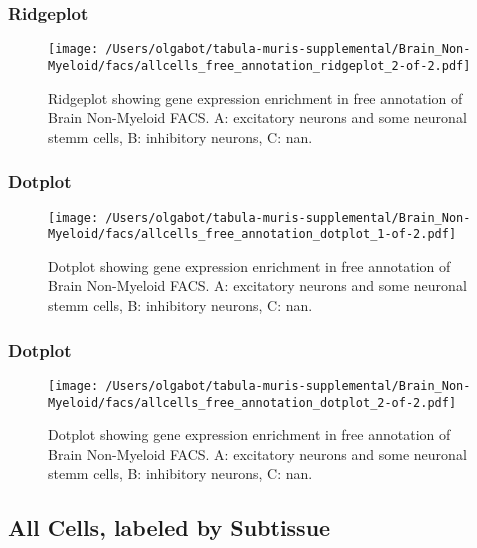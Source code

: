 \clearpage
\clearpage
\subsubsection{Ridgeplot}
\begin{figure}[h]
\centering
\texttt{[image: /Users/olgabot/tabula-muris-supplemental/Brain\_Non-Myeloid/facs/allcells\_free\_annotation\_ridgeplot\_2-of-2.pdf]}

\caption{ Ridgeplot  showing gene expression enrichment in free annotation of Brain Non-Myeloid FACS. A: excitatory neurons and some neuronal stemm cells, B: inhibitory neurons, C: nan.}
\end{figure}


\clearpage
\clearpage
\subsubsection{Dotplot}
\begin{figure}[h]
\centering
\texttt{[image: /Users/olgabot/tabula-muris-supplemental/Brain\_Non-Myeloid/facs/allcells\_free\_annotation\_dotplot\_1-of-2.pdf]}

\caption{ Dotplot  showing gene expression enrichment in free annotation of Brain Non-Myeloid FACS. A: excitatory neurons and some neuronal stemm cells, B: inhibitory neurons, C: nan.}
\end{figure}


\clearpage
\clearpage
\subsubsection{Dotplot}
\begin{figure}[h]
\centering
\texttt{[image: /Users/olgabot/tabula-muris-supplemental/Brain\_Non-Myeloid/facs/allcells\_free\_annotation\_dotplot\_2-of-2.pdf]}

\caption{ Dotplot  showing gene expression enrichment in free annotation of Brain Non-Myeloid FACS. A: excitatory neurons and some neuronal stemm cells, B: inhibitory neurons, C: nan.}
\end{figure}


\clearpage
\subsection{All Cells, labeled by Subtissue}
